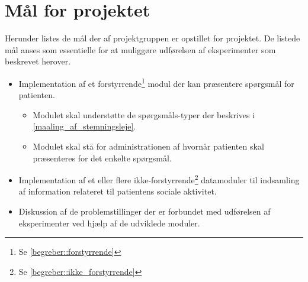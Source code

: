 \section{Mål for projektet}\label{problem:maal}
Herunder listes de mål der af projektgruppen er opstillet for projektet.
De listede mål anses som essentielle for at muliggøre udførelsen af eksperimenter som beskrevet herover.
\begin{itemize}
\item Implementation af et forstyrrende\footnote{Se \cref{begreber::forstyrrende}} modul der kan præsentere spørgsmål for patienten.
\begin{itemize}
	\item Modulet skal understøtte de spørgsmåls-typer der beskrives i \cref{maaling_af_stemningsleje}.
	\item Modulet skal stå for administrationen af hvornår patienten skal præsenteres for det enkelte spørgsmål.
\end{itemize}
\item Implementation af et eller flere ikke-forstyrrende\footnote{Se \cref{begreber::ikke_forstyrrende}} datamoduler til indsamling af information relateret til patientens sociale aktivitet.
\item Diskussion af de problemstillinger der er forbundet med udførelsen af eksperimenter ved hjælp af de udviklede moduler.
\end{itemize}